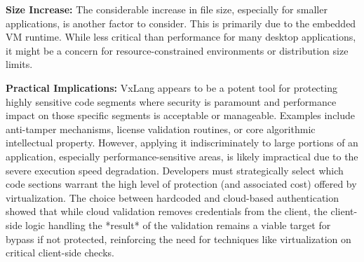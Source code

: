 \textbf{Size Increase:} The considerable increase in file size, especially for smaller applications, is another factor to consider. This is primarily due to the embedded VM runtime. While less critical than performance for many desktop applications, it might be a concern for resource-constrained environments or distribution size limits.

\textbf{Practical Implications:} VxLang appears to be a potent tool for protecting highly sensitive code segments where security is paramount and performance impact on those specific segments is acceptable or manageable. Examples include anti-tamper mechanisms, license validation routines, or core algorithmic intellectual property. However, applying it indiscriminately to large portions of an application, especially performance-sensitive areas, is likely impractical due to the severe execution speed degradation. Developers must strategically select which code sections warrant the high level of protection (and associated cost) offered by virtualization. The choice between hardcoded and cloud-based authentication showed that while cloud validation removes credentials from the client, the client-side logic handling the *result* of the validation remains a viable target for bypass if not protected, reinforcing the need for techniques like virtualization on critical client-side checks.
